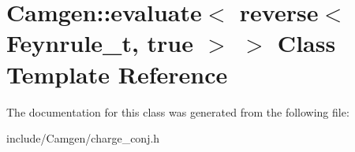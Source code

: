 \hypertarget{a00182}{}\section{Camgen\+:\+:evaluate$<$ reverse$<$ Feynrule\+\_\+t, true $>$ $>$ Class Template Reference}
\label{a00182}


The documentation for this class was generated from the following file\+:\begin{DoxyCompactItemize}
\item 
include/\+Camgen/charge\+\_\+conj.\+h\end{DoxyCompactItemize}
